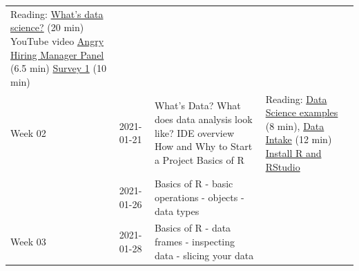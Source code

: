 \documentclass[
]{book}
\begin{document}
\begin{longtable}[]{@{}llll@{}}
\begin{minipage}[t]{0.22\columnwidth}
Reading: \href{readings/module2_what_is_data_science.pdf}{What's data science?} (20 min) YouTube video \href{https://youtu.be/6OFm7YcunWc?t=617}{Angry Hiring Manager Panel} (6.5 min) \href{https://forms.gle/M8bndLeUQLSJFrH99}{Survey 1} (10 min)\strut
\end{minipage}\tabularnewline
\begin{minipage}[t]{0.22\columnwidth}\raggedright
Week 02\strut
\end{minipage} & \begin{minipage}[t]{0.22\columnwidth}\raggedright
2021-01-21\strut
\end{minipage} & \begin{minipage}[t]{0.22\columnwidth}\raggedright
What's Data? What does data analysis look like? IDE overview How and Why to Start a Project Basics of R\strut
\end{minipage} & \begin{minipage}[t]{0.22\columnwidth}\raggedright
Reading: \href{readings/module2_eds_leek_whatsdatascience.pdf}{Data Science examples} (8 min), \href{readings/module2_modern_data_science_data_intake.pdf}{Data Intake} (12 min) \protect\hyperlink{install-r}{Install R and RStudio}\strut
\end{minipage}\tabularnewline
\begin{minipage}[t]{0.22\columnwidth}\raggedright
\strut
\end{minipage} & \begin{minipage}[t]{0.22\columnwidth}\raggedright
2021-01-26\strut
\end{minipage} & \begin{minipage}[t]{0.22\columnwidth}\raggedright
Basics of R - basic operations - objects - data types\strut
\end{minipage} & \begin{minipage}[t]{0.22\columnwidth}\raggedright
\strut
\end{minipage}\tabularnewline
\begin{minipage}[t]{0.22\columnwidth}\raggedright
Week 03\strut
\end{minipage} & \begin{minipage}[t]{0.22\columnwidth}\raggedright
2021-01-28\strut
\end{minipage} & \begin{minipage}[t]{0.22\columnwidth}\raggedright
Basics of R - data frames - inspecting data - slicing your data\strut
\end{minipage} & \begin{minipage}[t]{0.22\columnwidth}\raggedright

\end{minipage}
\end{longtable}
\end{document}
